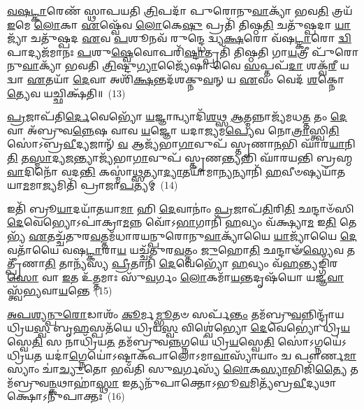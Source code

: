 \-\ul{𑌵}\-\-\ul{𑌷}\-\-\ul{𑌟𑍍𑌕𑌾}\-𑌰𑍇𑌣᳴ 𑌸𑍍𑌥𑌾𑌪𑌯𑌤𑌿 \ul{𑌤𑍍𑌰𑌿}\-𑌪𑌦𑌾᳴ 𑌪𑍁𑌰𑍋𑌨𑍁\-\ul{𑌵𑌾}\-𑌕𑍍𑌯𑌾᳴ 𑌭𑌵\-\ul{𑌤𑌿} 𑌤𑍍𑌰𑌯᳴ \ul{𑌇}\-𑌮𑍇 \ul{𑌲𑍋}\-𑌕𑌾 \ul{𑌏}\-𑌷𑍍𑌵𑍇᳴𑌵 \ul{𑌲𑍋}\-𑌕𑍇\-\ul{𑌷𑍁} 𑌪𑍍𑌰𑌤𑌿᳴ 𑌤𑌿𑌷𑍍𑌠\-\ul{𑌤𑌿} 𑌚𑌤𑍁᳴𑌷𑍍𑌪𑌦𑌾 \ul{𑌯𑌾}\-𑌜𑍍𑌯𑌾᳴ 𑌚𑌤𑍁᳴𑌷𑍍𑌪𑌦 \ul{𑌏}\-𑌵 \ul{𑌪}\-𑌶𑍂𑌨𑌵᳴ 𑌰𑍁𑌨𑍍𑌦𑍍𑌧𑍇 𑌦𑍍𑌵𑍍𑌯\-\ul{𑌕𑍍𑌷}\-𑌰𑍋 𑌵᳴𑌷\-\ul{𑌟𑍍𑌕𑌾}\-𑌰𑍋 \ul{𑌦𑍍𑌵𑌿}\-𑌪𑌾𑌦𑍍𑌯𑌜᳴𑌮𑌾𑌨𑌃 \ul{𑌪}\-𑌶𑍁\-\ul{𑌷𑍍𑌵𑍇}\-𑌵𑍋𑌪𑌰𑌿᳴\-\ul{𑌷𑍍𑌟𑌾}\-𑌤𑍍𑌪𑍍𑌰𑌤𑌿᳴ 𑌤𑌿𑌷𑍍𑌠𑌤𑌿 𑌗𑌾\-\ul{𑌯}\-𑌤𑍍𑌰𑍀 𑌪𑍁᳴𑌰𑍋𑌨𑍁\-\ul{𑌵𑌾}\-𑌕𑍍𑌯𑌾᳴ 𑌭𑌵𑌤𑌿 \ul{𑌤𑍍𑌰𑌿}\-𑌷𑍍𑌟𑍁\-\ul{𑌗𑍍𑌯𑌾}\-𑌜𑍍𑌯𑍈᳴𑌷𑌾 𑌵𑍈 \ul{𑌸}\-𑌪𑍍𑌤𑌪᳴\-\ul{𑌦𑌾} 𑌶𑌕𑍍𑌵᳴\-\ul{𑌰𑍀} 𑌯𑌦𑍍𑌵𑌾 \ul{𑌏}\-𑌤𑌯𑌾᳴ \ul{𑌦𑍇}\-𑌵𑌾 𑌅𑌶𑌿᳴\-\ul{𑌕𑍍𑌷}\-𑌨𑍍𑌤𑌦᳴𑌶𑌕𑍍𑌨𑍁\-\ul{𑌵}\-𑌨𑍍 𑌯 \ul{𑌏}\-𑌵𑌂 𑌵𑍇𑌦᳴ \ul{𑌶}\-𑌕𑍍𑌨𑍋\-\ul{𑌤𑍍𑌯𑍇}\-𑌵 𑌯𑌚𑍍𑌛𑌿𑌕𑍍𑌷᳴𑌤𑌿॥~(13)

{\anuvakamend[{\-\ul{𑌦𑍇}\-𑌵𑌤𑌾᳴𑌨𑌾𑌙𑍍𑌕𑌰𑍋\-\ul{𑌤𑍍𑌯𑍁}\-𑌪𑌰𑌿᳴𑌷𑍍𑌟𑌾\-\ul{𑌲𑍍𑌲}\-𑌕𑍍𑌷𑍍𑌮𑌾\-𑌽\-𑌽𑌜𑍍𑌯᳴𑌭𑌾\-\ul{𑌗𑍗} 𑌪𑍍𑌰𑌤𑌿᳴ \ul{𑌶}\-𑌕𑍍𑌨𑍋\-\ul{𑌤𑍍𑌯𑍇}\-𑌵 𑌦𑍍𑌵𑍇 𑌚᳴}]}%

\-\ul{𑌪𑍍𑌰}\-𑌜𑌾𑌪᳴𑌤𑌿\-\ul{𑌰𑍍𑌦𑍇}\-𑌵𑍇𑌭𑍍𑌯𑍋᳴ \ul{𑌯}\-𑌜𑍍𑌞𑌾𑌨𑍍𑌵𑍍𑌯𑌾𑌦𑌿᳴\-\ul{𑌶}\-𑌥𑍍𑌸 \ul{𑌆}\-𑌤𑍍𑌮𑌨𑍍𑌨𑌾𑌜𑍍𑌯᳴𑌮𑌧\-\ul{𑌤𑍍𑌤} 𑌤𑌂 \ul{𑌦𑍇}\-𑌵𑌾 𑌅᳴𑌬𑍍𑌰𑍁𑌵\-\ul{𑌨𑍍𑌨𑍇}\-𑌷 𑌵𑌾𑌵 \ul{𑌯}\-𑌜𑍍𑌞𑍋 𑌯𑌦𑌾\-\ul{𑌜𑍍𑌯}\-𑌮\-\ul{𑌪𑍍𑌯𑍇}\-𑌵 𑌨𑍋\-\ul{𑌤𑍍𑌰𑌾}\-𑌸𑍍𑌤𑍍𑌵𑌿\-\ul{𑌤𑌿} 𑌸𑍋॑\-𑌽𑌬𑍍𑌰\-\ul{𑌵𑍀}\-𑌦𑍍𑌯𑌜𑌾𑌨𑍍᳴ \ul{𑌵} 𑌆𑌜𑍍𑌯᳴𑌭𑌾\-\ul{𑌗𑌾}\-𑌵𑍁𑌪᳴ 𑌸𑍍𑌤𑍃𑌣𑌾\-\ul{𑌨}\-𑌭𑌿 𑌘𑌾᳴𑌰\-\ul{𑌯𑌾}\-𑌨𑌿\-\ul{𑌤𑌿} 𑌤\-\ul{𑌸𑍍𑌮𑌾}\-𑌦𑍍𑌯\-\ul{𑌜}\-𑌨𑍍𑌤𑍍𑌯𑌾𑌜𑍍𑌯᳴𑌭𑌾\-\ul{𑌗𑌾}\-𑌵𑍁𑌪᳴ 𑌸𑍍𑌤𑍃𑌣\-\ul{𑌨𑍍𑌤𑍍𑌯}\-𑌭𑌿 𑌘𑌾᳴𑌰𑌯𑌨𑍍𑌤𑌿 𑌬𑍍𑌰𑌹𑍍𑌮\-\ul{𑌵𑌾}\-𑌦𑌿𑌨𑍋᳴ 𑌵𑌦\-\ul{𑌨𑍍𑌤𑌿} 𑌕𑌸𑍍𑌮𑌾॑\-\ul{𑌥𑍍𑌸}\-𑌤𑍍𑌯𑌾\-\ul{𑌦𑍍𑌯𑌾}\-𑌤𑌯𑌾᳴𑌮𑌾\-\ul{𑌨𑍍𑌯}\-𑌨𑍍𑌯𑌾𑌨𑌿᳴ \ul{𑌹}\-𑌵𑍀𑍞𑌷𑍍𑌯𑌯𑌾᳴𑌤𑌯𑌾\-\ul{𑌮}\-𑌮𑌾\-\ul{𑌜𑍍𑌯}\-𑌮𑌿𑌤𑌿᳴ 𑌪𑍍𑌰𑌾𑌜𑌾\-\ul{𑌪}\-𑌤𑍍𑌯𑌮𑍍~(14)

𑌇𑌤𑌿᳴ 𑌬𑍍𑌰𑍂\-\ul{𑌯𑌾}\-𑌦𑌯𑌾᳴𑌤𑌯𑌾\-\ul{𑌮𑌾} 𑌹𑌿 \ul{𑌦𑍇}\-𑌵𑌾𑌨𑌾𑌂॑ \ul{𑌪𑍍𑌰}\-𑌜𑌾𑌪᳴\-\ul{𑌤𑌿}\-𑌰𑌿\-\ul{𑌤𑌿} 𑌛𑌨𑍍𑌦𑌾𑍞᳴𑌸𑌿 \ul{𑌦𑍇}\-𑌵𑍇𑌭𑍍𑌯𑍋\-𑌽𑌪𑌾॑𑌕𑍍𑌰𑌾\-\ul{𑌮}\-𑌨𑍍𑌨 𑌵𑍋᳴\-𑌽\-\ul{𑌭𑌾}\-𑌗𑌾𑌨𑌿᳴ \ul{𑌹}\-𑌵𑍍𑌯𑌂 𑌵᳴𑌕𑍍𑌷𑍍𑌯𑌾\-\ul{𑌮} 𑌇\-\ul{𑌤𑌿} 𑌤𑍇𑌭𑍍𑌯᳴ \ul{𑌏}\-𑌤𑌚𑍍𑌚᳴𑌤𑍁𑌰\-\ul{𑌵}\-𑌤𑍍𑌤𑌮᳴𑌧𑌾𑌰𑌯𑌨𑍍𑌪𑍁𑌰𑍋𑌨𑍁\-\ul{𑌵𑌾}\-𑌕𑍍𑌯𑌾᳴𑌯𑍈 \ul{𑌯𑌾}\-𑌜𑍍𑌯𑌾᳴𑌯𑍈 \ul{𑌦𑍇}\-𑌵𑌤𑌾᳴𑌯𑍈 𑌵𑌷\-\ul{𑌟𑍍𑌕𑌾}\-𑌰𑌾\-\ul{𑌯} 𑌯𑌚𑍍𑌚᳴𑌤𑍁𑌰\-\ul{𑌵}\-𑌤𑍍𑌤𑌂 \ul{𑌜𑍁}\-𑌹𑍋\-\ul{𑌤𑌿} 𑌛𑌨𑍍𑌦𑌾𑍟᳴\-\ul{𑌸𑍍𑌯𑍇}\-𑌵 𑌤𑌤𑍍𑌪𑍍𑌰𑍀᳴𑌣𑌾\-\ul{𑌤𑌿} 𑌤𑌾𑌨𑍍𑌯᳴𑌸𑍍𑌯 \ul{𑌪𑍍𑌰𑍀}\-𑌤𑌾𑌨𑌿᳴ \ul{𑌦𑍇}\-𑌵𑍇𑌭𑍍𑌯𑍋᳴ \ul{𑌹}\-𑌵𑍍𑌯𑌂 𑌵᳴\-\ul{𑌹}\-𑌨𑍍𑌤𑍍𑌯𑌙𑍍𑌗𑌿᳴𑌰\-\ul{𑌸𑍋} 𑌵𑌾 \ul{𑌇}\-𑌤 𑌉᳴\-\ul{𑌤𑍍𑌤}\-𑌮𑌾𑌃 𑌸𑍁᳴\-\ul{𑌵}\-𑌰𑍍𑌗𑌂 \ul{𑌲𑍋}\-𑌕𑌮𑌾᳴\-\ul{𑌯}\-𑌨𑍍𑌤𑌦𑍃𑌷᳴𑌯𑍋 𑌯𑌜𑍍𑌞\-\ul{𑌵𑌾}\-𑌸𑍍𑌤𑍍𑌵᳴\-\ul{𑌭𑍍𑌯}\-𑌵𑌾\-\ul{𑌯}\-𑌨𑍍𑌤𑍇~(15)

\-\ul{𑌅}\-\-\ul{𑌪}\-\-\ul{𑌶𑍍𑌯}\-\-\ul{𑌨𑍍𑌪𑍁}\-\-\ul{𑌰𑍋}\-𑌡𑌾𑌶𑌂᳴ \ul{𑌕𑍂}\-𑌰𑍍𑌮\-\ul{𑌮𑍍𑌭𑍂}\-𑌤𑍞 𑌸𑌰𑍍𑌪᳴\-\ul{𑌨𑍍𑌤𑌂} 𑌤𑌮᳴𑌬𑍍𑌰𑍁\-\ul{𑌵}\-𑌨𑍍𑌨𑌿𑌨𑍍𑌦𑍍𑌰𑌾᳴𑌯 𑌧𑍍𑌰𑌿𑌯\-\ul{𑌸𑍍𑌵} 𑌬𑍃\-\ul{𑌹}\-𑌸𑍍𑌪𑌤᳴𑌯𑍇 𑌧𑍍𑌰𑌿𑌯\-\ul{𑌸𑍍𑌵} 𑌵𑌿𑌶𑍍𑌵𑍇॑𑌭𑍍𑌯𑍋 \ul{𑌦𑍇}\-𑌵𑍇𑌭𑍍𑌯𑍋॑ 𑌧𑍍𑌰𑌿\-\ul{𑌯}\-𑌸𑍍𑌵𑍇\-\ul{𑌤𑌿} 𑌸 𑌨𑌾𑌧𑍍𑌰𑌿᳴𑌯\-\ul{𑌤} 𑌤𑌮᳴𑌬𑍍𑌰𑍁𑌵\-\ul{𑌨𑍍𑌨}\-𑌗𑍍𑌨𑌯𑍇॑ 𑌧𑍍𑌰𑌿\-\ul{𑌯}\-𑌸𑍍𑌵𑍇\-\ul{𑌤𑌿} 𑌸𑍋॑\-𑌽𑌗𑍍𑌨𑌯𑍇॑\-𑌽𑌧𑍍𑌰𑌿𑌯\-\ul{𑌤} 𑌯𑌦𑌾॑\-\ul{𑌗𑍍𑌨𑍇}\-𑌯𑍋॑\-𑌽𑌷𑍍𑌟𑌾𑌕᳴𑌪𑌾𑌲𑍋\-𑌽𑌮𑌾\-\ul{𑌵𑌾}\-𑌸𑍍𑌯𑌾᳴𑌯𑌾𑌂 𑌚 𑌪𑍗𑌰𑍍𑌣\-\ul{𑌮𑌾}\-𑌸𑍍𑌯𑌾𑌂 𑌚𑌾॑\-\ul{𑌚𑍍𑌯𑍁}\-𑌤𑍋 𑌭𑌵᳴𑌤𑌿 𑌸𑍁\-\ul{𑌵}\-𑌰𑍍𑌗𑌸𑍍𑌯᳴ \ul{𑌲𑍋}\-𑌕\-\ul{𑌸𑍍𑌯𑌾}\-𑌭𑌿𑌜𑌿᳴\-\ul{𑌤𑍍𑌯𑍈} 𑌤𑌮᳴𑌬𑍍𑌰𑍁𑌵\-\ul{𑌨𑍍𑌕}\-𑌥𑌾𑌹𑌾॑\-\ul{𑌸𑍍𑌥𑌾} 𑌇𑌤𑍍𑌯𑌨𑍁᳴𑌪𑌾𑌕𑍍𑌤𑍋\-𑌽𑌭𑍂\-\ul{𑌵}\-𑌮𑌿𑌤𑍍𑌯᳴𑌬𑍍𑌰\-\ul{𑌵𑍀}\-𑌦𑍍𑌯𑌥𑌾𑌕𑍍𑌷𑍋\-𑌽𑌨𑍁᳴𑌪𑌾𑌕𑍍𑌤𑌃~(16)

